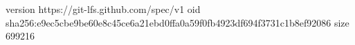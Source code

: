 version https://git-lfs.github.com/spec/v1
oid sha256:e9ec5cbe9be60e8c45ce6a21ebd0ffa0a59f0fb4923df694f3731c1b8ef92086
size 699216
